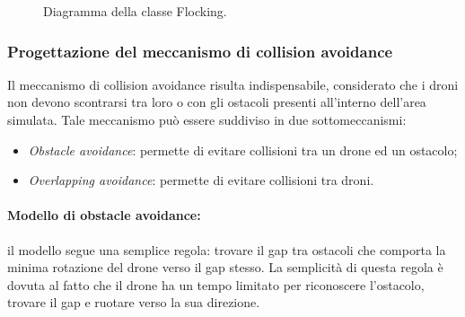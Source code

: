 \begin{figure}[H] 
    \captionsetup{justification=centering, margin=2cm, font=footnotesize}
    \begin{center}
    \end{center}
    \caption{Diagramma della classe Flocking.}
    \label{classe_flocking}
\end{figure}

\subsubsection{Progettazione del meccanismo di collision avoidance}

Il meccanismo di collision avoidance risulta indispensabile, considerato che i droni non devono scontrarsi tra loro o con gli ostacoli presenti all'interno dell'area simulata.
Tale meccanismo può essere suddiviso in due sottomeccanismi:

\begin{itemize}
    \item \textit{Obstacle avoidance}: permette di evitare collisioni tra un drone ed un ostacolo;
    \item \textit{Overlapping avoidance}: permette di evitare collisioni tra droni.
\end{itemize}

\paragraph{Modello di obstacle avoidance:} il modello segue una semplice regola: trovare il gap tra ostacoli che comporta la minima rotazione del drone verso il gap stesso. 
La semplicità di questa regola è dovuta al fatto che il drone ha un tempo limitato per riconoscere l’ostacolo, trovare il gap e ruotare verso la sua direzione.

